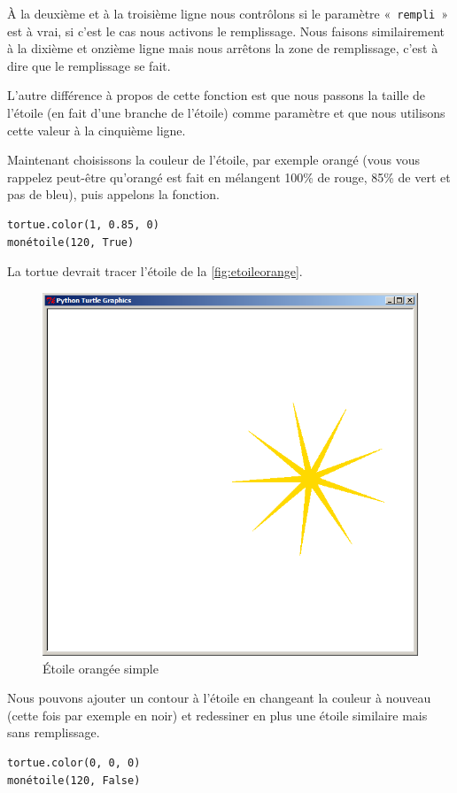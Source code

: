 À la deuxième et à la troisième ligne nous contrôlons si le paramètre «~\texttt{rempli}~» est à vrai, si c'est le cas nous activons le remplissage. Nous faisons similairement à la dixième et onzième ligne mais nous arrêtons la zone de remplissage, c'est à dire que le remplissage se fait.

L'autre différence à propos de cette fonction est que nous passons la taille de l'étoile (en fait d'une branche de l'étoile) comme paramètre et que nous utilisons cette valeur à la cinquième ligne.

Maintenant choisissons la couleur de l'étoile, par exemple orangé (vous vous rappelez peut-être qu'orangé est fait en mélangent 100\% de rouge, 85\% de vert et pas de bleu), puis appelons la fonction.

\begin{Verbatim}[frame=single,rulecolor=\color{mbleu}, label=à taper]
tortue.color(1, 0.85, 0)
monétoile(120, True)
\end{Verbatim}

La tortue devrait tracer l'étoile de la \autoref{fig:etoileorange}.
\begin{figure}[h!]
\centering
\includegraphics[scale=0.4]{images/etoileorange}
\caption{Étoile orangée simple}\label{fig:etoileorange}
\end{figure}

Nous pouvons ajouter un contour à l'étoile en changeant la couleur à nouveau (cette fois par exemple en noir) et redessiner en plus une étoile similaire mais sans remplissage.
\begin{Verbatim}[frame=single,rulecolor=\color{mbleu}, label=à taper]
tortue.color(0, 0, 0)
monétoile(120, False)
\end{Verbatim}

